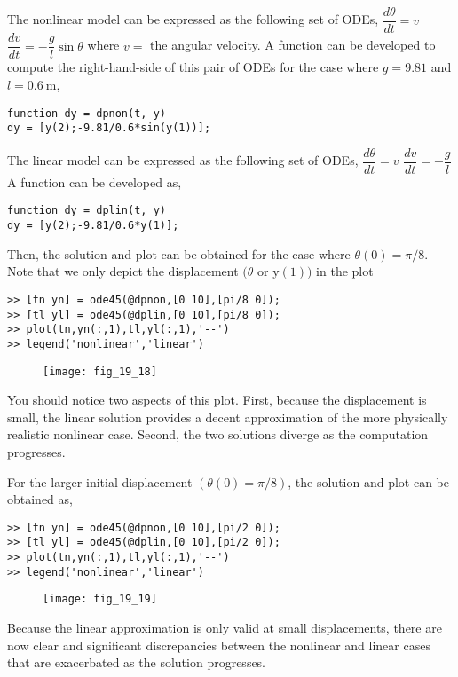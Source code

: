 \documentclass[../main.tex]{subfiles}
\begin{document}
\section{}
The nonlinear model can be expressed as the following set of ODEs,
	\bigbreak
$\dfrac{d \theta}{d t}=v$
	\bigbreak
$\dfrac{d v}{d t}=-\dfrac{g}{l} \sin \theta$
	\bigbreak
where $v=$ the angular velocity. A function can be developed to compute the right-hand-side of this pair of ODEs for the case where $g=9.81$ and $l=0.6 \mathrm{~m}$,
	\bigbreak
\begin{lstlisting}[numbers=none]
function dy = dpnon(t, y)
dy = [y(2);-9.81/0.6*sin(y(1))];
\end{lstlisting}
	\bigbreak
The linear model can be expressed as the following set of ODEs,
	\bigbreak
$\dfrac{d \theta}{d t}=v$
	\bigbreak
$\dfrac{d v}{d t}=-\dfrac{g}{l}$
	\bigbreak
A function can be developed as,
	\bigbreak
\begin{lstlisting}[numbers=none]
function dy = dplin(t, y)
dy = [y(2);-9.81/0.6*y(1)];
\end{lstlisting}
	\bigbreak
Then, the solution and plot can be obtained for the case where $\theta(0)=\pi / 8$. Note that we only depict the displacement $(\theta$ or $\mathrm{y}(1))$ in the plot
	\bigbreak
\begin{lstlisting}[numbers=none]
>> [tn yn] = ode45(@dpnon,[0 10],[pi/8 0]);
>> [tl yl] = ode45(@dplin,[0 10],[pi/8 0]);
>> plot(tn,yn(:,1),tl,yl(:,1),'--')
>> legend('nonlinear','linear') 
\end{lstlisting}
	\bigbreak
	\begin{figure}[H]
		\texttt{[image: fig\_19\_18]}
		\label{fig:fig_19_18}
	\end{figure}
	\bigbreak
\begin{blockquote}
You should notice two aspects of this plot. First, because the displacement is small, the linear solution provides a decent approximation of the more physically realistic nonlinear case. Second, the two solutions diverge as the computation progresses.
\end{blockquote}
	\bigbreak
For the larger initial displacement $(\theta(0)=\pi / 8)$, the solution and plot can be obtained as,
	\bigbreak
\begin{lstlisting}[numbers=none]
>> [tn yn] = ode45(@dpnon,[0 10],[pi/2 0]);
>> [tl yl] = ode45(@dplin,[0 10],[pi/2 0]);
>> plot(tn,yn(:,1),tl,yl(:,1),'--')
>> legend('nonlinear','linear') 
\end{lstlisting}
	\bigbreak
	\begin{figure}[H]
		\texttt{[image: fig\_19\_19]}
		\label{fig:fig_19_19}
	\end{figure}
	\bigbreak
\begin{blockquote}
Because the linear approximation is only valid at small displacements, there are now clear and significant discrepancies between the nonlinear and linear cases that are exacerbated as the solution progresses.
\end{blockquote}
	\bigbreak
\end{document}
